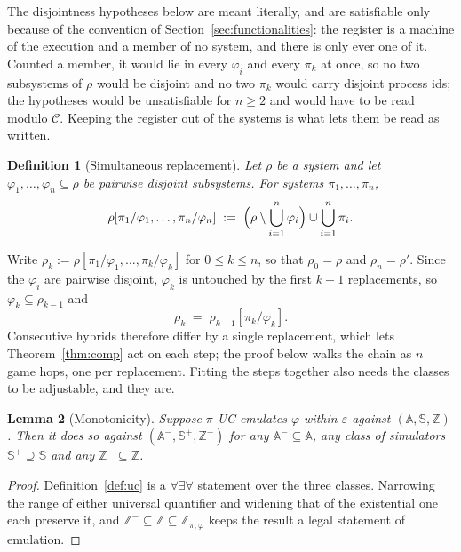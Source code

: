 \documentclass[11pt,a4paper]{article}
\newcommand{\Corr}{\mathcal{C}}
\newcommand{\Aset}{\mathbb{A}}
\newcommand{\SimSet}{\mathbb{S}}
\newcommand{\ZenvSet}{\mathbb{Z}}
\theoremstyle{accentdef}
\newtheorem{definition}{Definition}[section]
\theoremstyle{accentplain}
\newtheorem{lemma}[definition]{Lemma}
\begin{document}
The disjointness hypotheses below are meant literally, and are satisfiable only because of the
convention of Section~\ref{sec:functionalities}: the register is a machine of the execution and a
member of no system, and there is only ever one of it. Counted a member, it would lie in every
$\varphi_i$ and every $\pi_k$ at once, so no two subsystems of $\rho$ would be disjoint and no two
$\pi_k$ would carry disjoint process ids; the hypotheses would be unsatisfiable for $n \geq 2$ and
would have to be read modulo $\Corr$. Keeping the register out of the systems is what lets them be
read as written.

\begin{definition}[Simultaneous replacement]\label{def:multirepl}
Let $\rho$ be a system and let $\varphi_1,\ldots,\varphi_n \subseteq \rho$ be pairwise disjoint
subsystems. For systems $\pi_1,\ldots,\pi_n$,
\[
  \rho[\pi_1/\varphi_1,\ldots,\pi_n/\varphi_n] \;:=\; \Bigl(\rho \setminus \bigcup_{i=1}^{n} \varphi_i\Bigr) \cup \bigcup_{i=1}^{n} \pi_i .
\]
\end{definition}

Write $\rho_k := \rho[\pi_1/\varphi_1,\ldots,\pi_k/\varphi_k]$ for $0 \leq k \leq n$, so that
$\rho_0 = \rho$ and $\rho_n = \rho'$. Since the $\varphi_i$ are pairwise disjoint, $\varphi_k$
is untouched by the first $k-1$ replacements, so $\varphi_k \subseteq \rho_{k-1}$ and
\[
  \rho_k \;=\; \rho_{k-1}[\pi_k/\varphi_k] .
\]
Consecutive hybrids therefore differ by a single replacement, which lets Theorem~\ref{thm:comp}
act on each step; the proof below walks the chain as $n$ game hops, one per replacement. Fitting
the steps together also needs the classes to be adjustable, and they are.

\begin{lemma}[Monotonicity]\label{lem:mono}
Suppose $\pi$ UC-emulates $\varphi$ within $\varepsilon$ against $(\Aset,\SimSet,\ZenvSet)$.
Then it does so against $(\Aset^{-},\SimSet^{+},\ZenvSet^{-})$ for any $\Aset^{-} \subseteq \Aset$,
any class of simulators $\SimSet^{+} \supseteq \SimSet$ and any $\ZenvSet^{-} \subseteq \ZenvSet$.
\end{lemma}

\begin{proof}
Definition~\ref{def:uc} is a $\forall\exists\forall$ statement over the three classes.
Narrowing the range of either universal quantifier and widening that of the existential one
each preserve it, and $\ZenvSet^{-} \subseteq \ZenvSet \subseteq \ZenvSet_{\pi,\varphi}$ keeps
the result a legal statement of emulation.
\end{proof}
\end{document}
